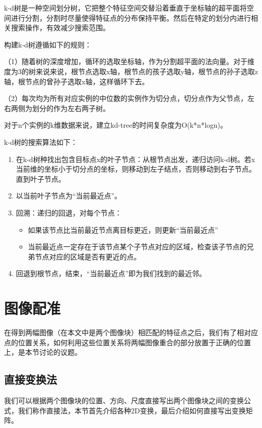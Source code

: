 k-d树是一种空间划分树，它把整个特征空间交替沿着垂直于坐标轴的超平面将空间进行分割，分割时尽量使得特征点的分布保持平衡。然后在特定的划分内进行相关搜索操作，有效减少搜索范围。

构建k-d树遵循如下的规则：

（1）随着树的深度增加，循环的选取坐标轴，作为分割超平面的法向量。对于维度为3的树来说来说，根节点选取x轴，根节点的孩子选取y轴，根节点的孙子选取z轴，根节点的曾孙子选取x轴，这样循环下去。

（2）每次均为所有对应实例的中位数的实例作为切分点，切分点作为父节点，左右两侧为划分的作为左右两子树。

对于n个实例的k维数据来说，建立kd-tree的时间复杂度为O(k*n*logn)。

k-d树的搜索算法如下\cite{李航2012统计学习方法}：
\begin{enumerate}
\item 在k-d树种找出包含目标点x的叶子节点：从根节点出发，递归访问k-d树。若x当前维的坐标小于切分点的坐标，则移动到左子结点，否则移动到右子节点。直到叶子节点。
\item 以当前叶子节点为“当前最近点”。
\item 回溯：递归的回退，对每个节点：

	\begin{itemize}
	\item 如果该节点比当前最近节点离目标更近，则更新“当前最近点”
	\item 当前最近点一定存在于该节点某个子节点对应的区域，检查该子节点的兄弟节点对应的区域是否有更近的点。
	\end{itemize}

\item 回退到根节点，结束，“当前最近点”即为我们找到的最近邻。
\end{enumerate}
\section{图像配准}

在得到两幅图像（在本文中是两个图像块）相匹配的特征点之后，我们有了相对应点的位置关系，如何利用这些位置关系将两幅图像重合的部分放置于正确的位置上，是本节讨论的议题。

\subsection{直接变换法}
我们可以根据两个图像块的位置、方向、尺度直接写出两个图像块之间的变换公式，我们称作直接法，本节首先介绍各种2D变换，最后介绍如何直接写出变换矩阵。

